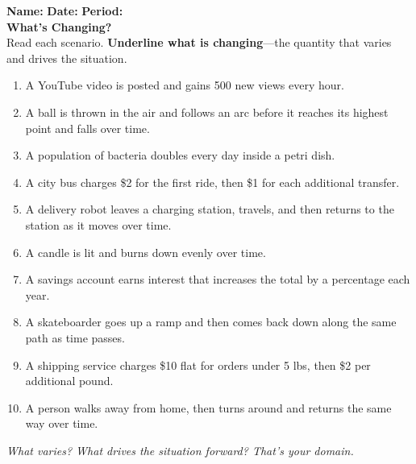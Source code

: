 \documentclass[12pt,landscape]{article}
\begin{document}
\begin{minipage}[t]{0.48\textwidth}
\raggedright
\vspace*{-1em}
\noindent
\textbf{Name:} \underline{\hspace{2in}} \hfill
\textbf{Date:} \underline{\hspace{0.5in}} \hfill
\textbf{Period:} \underline{\hspace{0.3in}} \\

\Large\textbf{What's Changing?} \\
\normalsize
\vspace{1em}
Read each scenario. \textbf{Underline what is changing}—the quantity that varies and drives the situation.

\vspace{1em}
\begin{enumerate}
  \item A YouTube video is posted and gains 500 new views every hour.
  \item A ball is thrown in the air and follows an arc before it reaches its highest point and falls over time.
  \item A population of bacteria doubles every day inside a petri dish.
  \item A city bus charges \$2 for the first ride, then \$1 for each additional transfer.
  \item A delivery robot leaves a charging station, travels, and then returns to the station as it moves over time.
  \item A candle is lit and burns down evenly over time.
  \item A savings account earns interest that increases the total by a percentage each year.
  \item A skateboarder goes up a ramp and then comes back down along the same path as time passes.
  \item A shipping service charges \$10 flat for orders under 5 lbs, then \$2 per additional pound.
  \item A person walks away from home, then turns around and returns the same way over time.
\end{enumerate}

\vfill
\small\textit{What varies? What drives the situation forward? That’s your domain.}
\end{minipage}
\end{document}
